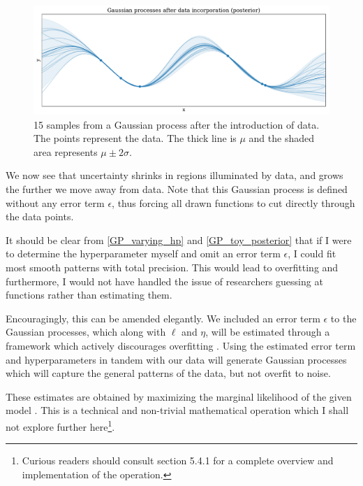 \documentclass[a4paper]{article}
\begin{document}
\begin{figure}[!htb]
	\centering
	\includegraphics[scale=0.47]{GP_toy_posterior.pdf}
    \caption{\footnotesize{15 samples from a Gaussian process after the introduction of data. The points represent the data. The thick line is $\mu$ and the shaded area represents $\mu \pm 2\sigma$.}}\label{GP_toy_posterior}
\end{figure}

We now see that uncertainty shrinks in regions illuminated by data, and grows the further we move away from data. Note that this Gaussian process is defined without any error term $\epsilon$, thus forcing all drawn functions to cut directly through the data points.\par

It should be clear from \autoref{GP_varying_hp} and \autoref{GP_toy_posterior} that if I were to determine the hyperparameter myself and omit an error term $\epsilon$, I could fit most smooth patterns with total precision. This would lead to overfitting and furthermore, I would not have handled the issue of researchers guessing at functions rather than estimating them.\par

Encouragingly, this can be amended elegantly. We included an error term $\epsilon$ to the Gaussian processes, which along with $\ell$ and $\eta$, will be estimated through a framework which actively discourages overfitting \cite[114-115]{williams2006gaussian}. Using the estimated error term and hyperparameters in tandem with our data will generate Gaussian processes which will capture the general patterns of the data, but not overfit to noise.\par

These estimates are obtained by maximizing the marginal likelihood of the given model \cite[114-115]{williams2006gaussian}. This is a technical and non-trivial mathematical operation which I shall not explore further here\footnote{Curious readers should consult \cite{williams2006gaussian} section 5.4.1 for a complete overview and implementation of the operation.}.\par
\end{document}
